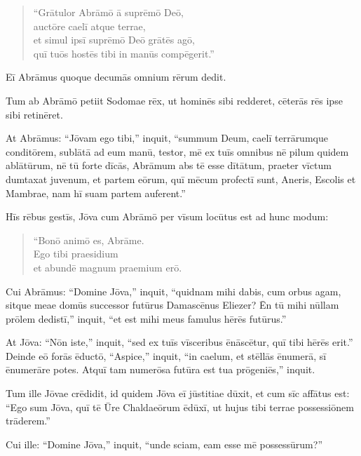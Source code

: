 \begin{verse}
\begin{patverse*}
``Grātulor Abrāmō ā suprēmō Deō, \\
auctōre caelī atque terrae,\\
\Versus et simul ipsī suprēmō Deō grātēs agō, \\
quī tuōs hostēs tibi in manūs compēgerit.''
\end{patverse*}
\end{verse}
Eī Abrāmus quoque decumās omnium rērum dedit.

\Versus Tum ab Abrāmō petiit Sodomae rēx, ut hominēs sibi redderet, cēterās rēs ipse sibi retinēret.

\Versus At Abrāmus: ``Jōvam ego tibi,'' inquit, ``summum Deum, caelī terrārumque conditōrem, sublātā ad eum manū, testor,
\Versus mē ex tuīs omnibus nē pilum quidem ablātūrum, nē tū forte dīcās, Abrāmum abs tē esse dītātum,
\Versus praeter vīctum dumtaxat juvenum, et partem eōrum, quī mēcum profectī sunt, Aneris, Escolis et Mambrae, nam hī suam partem auferent.''



\Caput
\Versus Hīs rēbus gestīs, Jōva cum Abrāmō per vīsum locūtus est ad hunc modum:

\begin{verse}
\begin{patverse*}
``Bonō animō es, Abrāme. \\
Ego tibi praesidium \\
et abundē magnum praemium erō.
\end{patverse*}
\end{verse}

\Versus Cui Abrāmus: ``Domine Jōva,'' inquit, ``quidnam mihi dabis, cum orbus agam, sitque meae domūs successor futūrus Damascēnus Eliezer?
\Versus Ēn tū mihi nūllam prōlem dedistī,'' inquit, ``et est mihi meus famulus hērēs futūrus.''

\Versus At Jōva: ``Nōn iste,'' inquit, ``sed ex tuīs vīsceribus ēnāscētur, quī tibi hērēs erit.''
\Versus Deinde eō forās ēductō, ``Aspice,'' inquit, ``in caelum, et stēllās ēnumerā, sī ēnumerāre potes. Atquī tam numerōsa futūra est tua prōgeniēs,'' inquit.

\Versus Tum ille Jōvae crēdidit, id quidem Jōva eī jūstitiae dūxit,
\Versus et cum sīc affātus est: ``Ego sum Jōva, quī tē Ūre Chaldaeōrum ēdūxī, ut hujus tibi terrae possessiōnem trāderem.''

\Versus Cui ille: ``Domine Jōva,'' inquit, ``unde sciam, eam esse mē possessūrum?''

